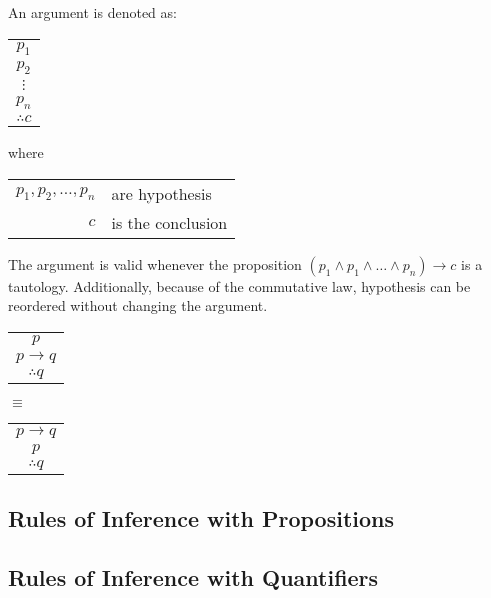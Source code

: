 \documentclass{article}
\begin{document}
An argument is denoted as:
\begin{tabular}{c}
  \(p_1\)     \\
  \(p_2\)     \\
  \(\vdots \) \\
  \(p_n\)     \\
  \hline
  \(\therefore c\)
\end{tabular}
\quad where \quad
\begin{tabular}{rl}
  \(p_1, p_2, \ldots, p_n\) & are hypothesis    \\
  \(c\)                     & is the conclusion
\end{tabular}
The argument is valid whenever the proposition \((p_1 \land p_1 \land \dots \land p_n) \rightarrow c\) is a tautology.
Additionally, because of the commutative law, hypothesis can be reordered without changing the argument.
\begin{center}
  \begin{tabular}{c}
    \(p\)               \\
    \(p \rightarrow q\) \\
    \hline
    \(\therefore q\)
  \end{tabular}
  \quad
  \(\equiv\)
  \quad
  \begin{tabular}{c}
    \(p \rightarrow q\) \\
    \(p\)               \\
    \hline
    \(\therefore q\)
  \end{tabular}
\end{center}

\subsection{Rules of Inference with Propositions}



\subsection{Rules of Inference with Quantifiers}
\end{document}
